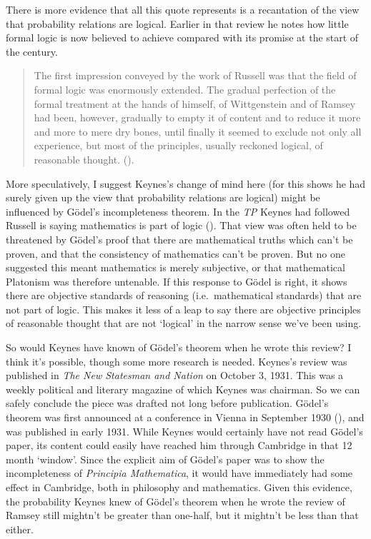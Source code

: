 \documentclass[
  11pt,
  letterpaper,
  DIV=11,
  numbers=noendperiod,
  twoside]{scrartcl}
\begin{document}
There is more evidence that all this quote represents is a recantation
of the view that probability relations are logical. Earlier in that
review he notes how little formal logic is now believed to achieve
compared with its promise at the start of the century.

\begin{quote}
The first impression conveyed by the work of Russell was that the field
of formal logic was enormously extended. The gradual perfection of the
formal treatment at the hands of himself, of Wittgenstein and of Ramsey
had been, however, gradually to empty it of content and to reduce it
more and more to mere dry bones, until finally it seemed to exclude not
only all experience, but most of the principles, usually reckoned
logical, of reasonable thought. ().
\end{quote}

More speculatively, I suggest Keynes's change of mind here (for this
shows he had surely given up the view that probability relations are
logical) might be influenced by Gödel's incompleteness theorem. In the
\emph{TP} Keynes had followed Russell is saying mathematics is part of
logic (). That view was
often held to be threatened by Gödel's proof that there are mathematical
truths which can't be proven, and that the consistency of mathematics
can't be proven. But no one suggested this meant mathematics is merely
subjective, or that mathematical Platonism was therefore untenable. If
this response to Gödel is right, it shows there are objective standards
of reasoning (i.e.~mathematical standards) that are not part of logic.
This makes it less of a leap to say there are objective principles of
reasonable thought that are not `logical' in the narrow sense we've been
using.

So would Keynes have known of Gödel's theorem when he wrote this review?
I think it's possible, though some more research is needed. Keynes's
review was published in \emph{The New Statesman and Nation} on October
3, 1931. This was a weekly political and literary magazine of which
Keynes was chairman. So we can safely conclude the piece was drafted not
long before publication. Gödel's theorem was first announced at a
conference in Vienna in September 1930 (), and was published in early 1931. While Keynes would certainly
have not read Gödel's paper, its content could easily have reached him
through Cambridge in that 12 month `window'. Since the explicit aim of
Gödel's paper was to show the incompleteness of \emph{Principia
Mathematica}, it would have immediately had some effect in Cambridge,
both in philosophy and mathematics. Given this evidence, the probability
Keynes knew of Gödel's theorem when he wrote the review of Ramsey still
mightn't be greater than one-half, but it mightn't be less than that
either.
\end{document}
